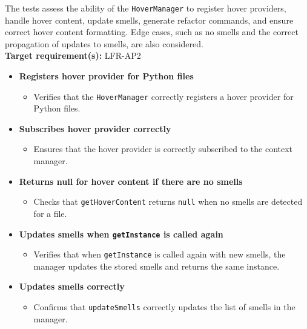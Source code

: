 \documentclass[12pt, titlepage]{article}
\begin{document}
\noindent The tests assess the ability of the \texttt{HoverManager} to register hover providers, handle hover content, update smells, generate refactor commands, and ensure correct hover content formatting. Edge cases, such as no smells and the correct propagation of updates to smells, are also considered.\\

\noindent \textbf{Target requirement(s):} LFR-AP2~\cite{SRS} \\

\begin{itemize}
    \item \textbf{Registers hover provider for Python files}
    \begin{itemize}
        \item Verifies that the \texttt{HoverManager} correctly registers a hover provider for Python files.
    \end{itemize}

    \item \textbf{Subscribes hover provider correctly}
    \begin{itemize}
        \item Ensures that the hover provider is correctly subscribed to the context manager.
    \end{itemize}

    \item \textbf{Returns null for hover content if there are no smells}
    \begin{itemize}
        \item Checks that \texttt{getHoverContent} returns \texttt{null} when no smells are detected for a file.
    \end{itemize}

    \item \textbf{Updates smells when \texttt{getInstance} is called again}
    \begin{itemize}
        \item Verifies that when \texttt{getInstance} is called again with new smells, the manager updates the stored smells and returns the same instance.
    \end{itemize}

    \item \textbf{Updates smells correctly}
    \begin{itemize}
        \item Confirms that \texttt{updateSmells} correctly updates the list of smells in the manager.
    \end{itemize}


\end{itemize}
\end{document}
